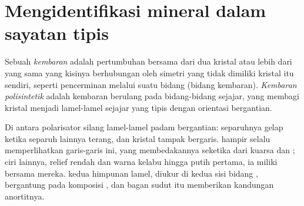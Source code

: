 \section{Mengidentifikasi mineral dalam sayatan tipis}

\begin{definition}\label{def:b1:optical-mineralogy:twin}
Sebuah \emph{kembaran} adalah pertumbuhan bersama dari dua kristal atau lebih dari  yang sama yang kisinya berhubungan oleh simetri yang tidak dimiliki kristal itu sendiri, seperti pencerminan melalui suatu bidang (bidang kembaran). \emph{Kembaran polisintetik} adalah kembaran berulang pada bidang-bidang sejajar, yang membagi kristal menjadi lamel-lamel sejajar yang tipis dengan orientasi bergantian.
\end{definition}

Di antara polarisator silang lamel-lamel  padam bergantian: separuhnya gelap ketika separuh lainnya terang, dan kristal tampak bergaris.  hampir selalu memperlihatkan garis-garis ini, yang membedakannya seketika dari kuarsa dan ; ciri lainnya, relief rendah dan warna kelabu hingga putih  pertama, ia miliki bersama mereka.  kedua himpunan lamel, diukur di kedua sisi bidang , bergantung pada komposisi , dan bagan sudut itu memberikan kandungan anortitnya.

